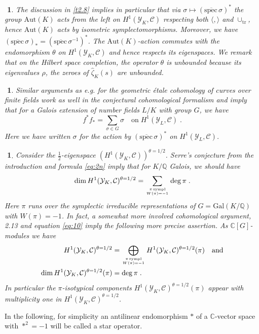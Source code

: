 \documentclass[12pt,leqno]{article}
\newcommand{\C}{{\mathbb{C}}}
\newcommand{\Q}{{\mathbb{Q}}}
\newcommand{\spec}{\mathrm{spec}\,}
\newcommand{\tr}{\mathrm{tr}}
\newcommand{\Aut}{\mathrm{Aut}}
\newcommand{\Gal}{\mathrm{Gal}}
\newcommand{\Ch}{{\mathcal C}}
\newcommand{\Yh}{\mathcal{Y}}
\newcommand{\hzeta}{\hat{\zeta}}
\newcommand{\halb}{\frac{1}{2}}
\newtheorem{punkt}[theorem]{$\!\!$}
\begin{document}
\begin{punkt} \label{t2.9} \em 
The discussion in \ref{t2.8} implies in particular that via $\sigma \mapsto (\overline{\spec} \sigma)^*$ the group $\Aut (K)$ acts from the left on $H^1 (\Yh_K , \Ch)$ respecting both $\langle , \rangle$ and $\cup_{\tr}$, hence $\Aut (K)$ acts by isometric symplectomorphisms. Moreover, we have $(\overline{\spec} \sigma)_* = (\overline{\spec} \sigma^{-1})^*$. The $\Aut (K)$-action commutes with the endomorphism $\theta$ on $H^1 (\Yh_K , \Ch)$ and hence respects its eigenspaces. We remark that on the Hilbert space completion, the operator $\theta$ is unbounded because its eigenvalues $\rho$, the zeroes of $\hzeta_K (s)$ are unbounded.
\end{punkt}
\begin{punkt} \label{t2.10} \em 
Similar arguments as e.g. for the geometric \'etale cohomology of curves over finite fields work as well in the conjectural cohomological formalism and imply that for a Galois extension of number fields $L / K$ with group $G$, we have 
\begin{equation} \label{eq:9}
f^* f_* = \sum_{\sigma \in G} \sigma \quad \text{on} \; H^1 (\Yh_L , \Ch) \; .
\end{equation}
Here we have written $\sigma$ for the action by $(\overline{\spec} \sigma)^*$ on $H^1 (\Yh_L , \Ch)$.
\end{punkt}
\begin{punkt} \label{t2.12} \em 
Consider the $\halb$-eigenspace $(H^1 (\Yh_K , \Ch))^{\theta = 1/2}$. Serre's conjecture from the introduction and formula \eqref{eq:2n} imply that for $K / \Q$ Galois, we should have 
\begin{equation}
\label{eq:10}
\dim H^1 (\Yh_K , \Ch)^{\theta = 1/2} = \sum_{\pi \, \text{sympl} \atop W (\pi) = -1} \deg \pi \; .
\end{equation}
Here $\pi$ runs over the symplectic irreducible representations of $G = \Gal (K / \Q)$ with $W (\pi) = -1$. In fact, a somewhat more involved cohomological argument, \cite{D2} 2.13 and equation \eqref{eq:10} imply the following more precise assertion. As $\C [G]$-modules we have
\begin{align*}
H^1 (\Yh_K , \Ch)^{\theta = 1/2} & = \bigoplus_{\pi \, \text{sympl} \atop W (\pi) = -1} H^1 (\Yh_K , \Ch)^{\theta = 1/2}  (\pi) \quad \text{and}\\
\dim H^1 (\Yh_K , \Ch)^{\theta = 1/2} (\pi) & = \deg\pi \; .
\end{align*}
In particular the $\pi$-isotypical components $H^1 (\Yh_K , \Ch)^{\theta = 1/2} (\pi)$ appear with multiplicity one in $H^1 (\Yh_K , \Ch)^{\theta = 1/2}$. 
\end{punkt}
In the following, for simplicity an antilinear endomorphism $*$ of a $\C$-vector space with $*^2 = -1$ will be called a star operator.
\end{document}
